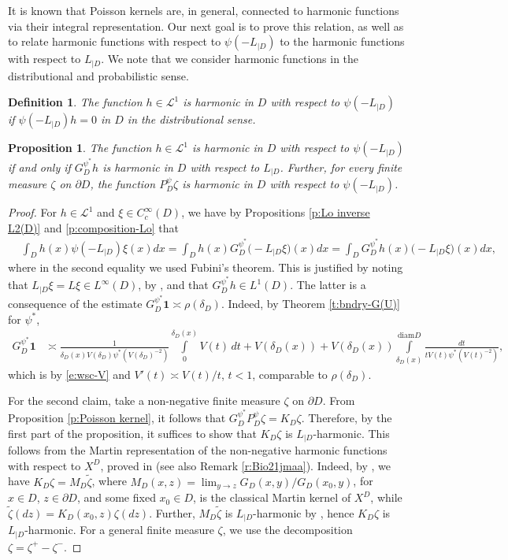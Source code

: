 \documentclass[12pt,a4paper,onecolumn]{article}
\newtheorem{prop}[thm]{Proposition}
\newtheorem{defn}[thm]{Definition}
\theoremstyle{definition}
\newcommand{\1}{\mathbf 1}
\newcommand{\de}{\delta_D}
\newcommand{\wt}{\widetilde}
\newcommand{\calL}{\mathcal{L}^1}
\newcommand{\Lbase}{L_{|D}}
\newcommand{\Lo}{\psi(-L_{|D})}
\newcommand{\GDPs}{G_D^{\psi^*}}
\newcommand{\PDS}{P^{\psi}_{ D}}
\newcommand{\diam}{\textrm{diam}}
\numberwithin{equation}{section}
\begin{document}
		It is known that Poisson kernels are, in general, connected to harmonic functions via their integral representation. Our next goal is to prove this relation, as well as to relate harmonic functions with respect to $\Lo$ to the harmonic functions with respect to $\Lbase$.  We note that we consider harmonic functions in the distributional and probabilistic sense.
        
	\begin{defn}\label{def:harmonic}
		The function $h\in \calL$ is harmonic in $D$ with respect to $\Lo$ if $\Lo h=0$
		in $D$ in the distributional sense.
	\end{defn}
	\begin{prop}\label{p:harmonic connect}
		The function $h\in \calL$ is harmonic in $D$ with respect to $\Lo$ if and only if
		$\GDPs h$ is harmonic in $D$ with respect to $\Lbase$. Further,
		for every finite measure $\zeta$ on $\partial D$, the function $\PDS \zeta$ is
		harmonic in $D$ with respect to $\Lo$.
	\end{prop}
	\begin{proof}
		For $h\in \calL$ and $\xi\in C_c^\infty(D)$, we have by Propositions \ref{p:Lo inverse L2(D)} and  \ref{p:composition-Lo} that 
		\begin{align*}
			&\int_D h(x) \Lo \xi(x)dx=
			\int_D h(x) \GDPs  \big(-\Lbase\xi\big)(x)dx=\int_D \GDPs h(x) \big(-\Lbase\xi\big)(x)dx,
		\end{align*}
		where in the second equality  we used Fubini's theorem. This is justified by noting that $\Lbase \xi= L\xi \in L^\infty(D)$, by \cite[Eq. (6)]{Bio21jmaa}, and that $\GDPs h\in L^1(D)$. The latter is a consequence of the estimate $\GDPs \1 \asymp \rho(\de)$.
		Indeed, by Theorem \ref{t:bndry-G(U)} for $\psi^*$,
		\begin{align*}
			\GDPs \1&\asymp 
			\frac{1}{\de(x)V(\de)\psi^*(V(\de)^{-2})}\!\!\!\int\limits_0^{\de(x)}\!\!\!V(t)\, dt+V(\de(x))+V(\de(x))\!\!\!\int\limits_{\de(x)}^{\diam D}
			\!\!\!\frac{dt}{t V(t)\psi^*(V(t)^{-2})},
		\end{align*}
        	which is by \eqref{e:wsc-V} and $V'(t)\asymp V(t)/t$, $t<1$, comparable to $\rho(\de)$.
		
		For the second claim, take a non-negative finite measure $\zeta$ on $\partial D$. From Proposition \ref{p:Poisson kernel}, it follows that $\GDPs \PDS \zeta = K_D\zeta$.  Therefore, by the first part of the proposition, it suffices to show that $K_D\zeta$ is $\Lbase$-harmonic. This follows from the Martin representation of the non-negative harmonic functions with respect to $X^D$, proved in \cite{Bio21jmaa} (see also Remark \ref{r:Bio21jmaa}). Indeed, by \cite[Eq. (4.24)]{BVW-na21}, we have $K_D\zeta=M_D\wt\zeta$, where $M_D(x,z)=\lim_{y\to z}G_D(x,y)/G_D(x_0,y)$, for $x\in D$, $z\in \partial D$, and some fixed $x_0\in D$, is the classical Martin kernel of $X^D$, while $\wt\zeta(d z)=K_D(x_0,z)\zeta(dz)$. Further, $M_D\wt\zeta$ is $\Lbase$-harmonic by \cite[Proposition 5.11 \& Theorem 3.16]{Bio21jmaa}, hence $K_D\zeta$ is $\Lbase$-harmonic. For a general finite measure $\zeta$, we use the decomposition $\zeta=\zeta^+-\zeta^-$.
	\end{proof}
\end{document}

